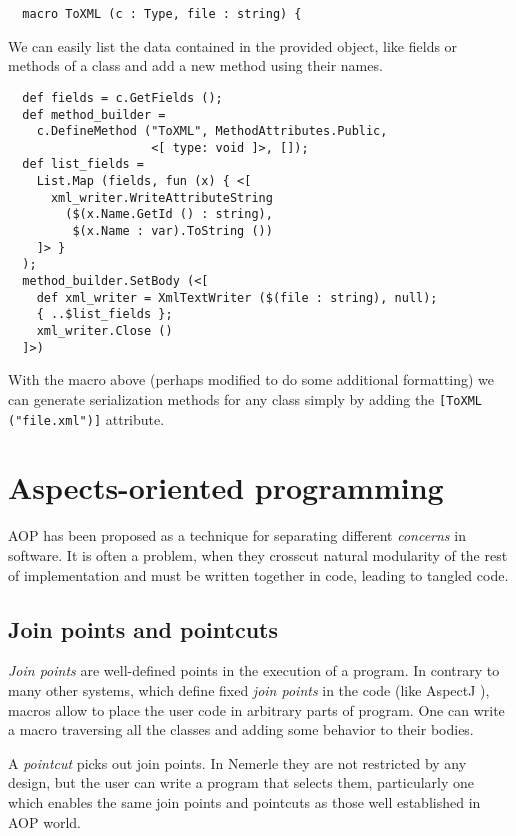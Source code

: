 \documentclass{llncs}
\begin{document}
\begin{verbatim}
  macro ToXML (c : Type, file : string) { 
\end{verbatim}

We can easily list the data contained in the provided object, like fields 
or methods of a class and add a new method using their names.

\begin{verbatim}
  def fields = c.GetFields ();
  def method_builder = 
    c.DefineMethod ("ToXML", MethodAttributes.Public, 
                    <[ type: void ]>, []);
  def list_fields = 
    List.Map (fields, fun (x) { <[ 
      xml_writer.WriteAttributeString 
        ($(x.Name.GetId () : string), 
         $(x.Name : var).ToString ())
    ]> }
  );
  method_builder.SetBody (<[
    def xml_writer = XmlTextWriter ($(file : string), null);
    { ..$list_fields };
    xml_writer.Close ()
  ]>)
\end{verbatim}

With the macro above (perhaps modified to do some additional formatting)
we can generate serialization methods for any class simply by adding 
the \verb,[ToXML ("file.xml")], attribute.

\section{Aspects-oriented programming}
AOP has been proposed as a technique for separating different 
\emph{concerns} in software. It is often a problem, when they crosscut 
natural modularity of the rest of implementation and must be written 
together in code, leading to tangled code. 

\subsection{Join points and pointcuts}
\emph{Join points} are well-defined points in the execution of a program.
In contrary to many other systems, which define fixed \emph{join points}
in the code (like AspectJ \cite{AspectJ}), macros allow to place the user code in 
arbitrary parts of program. One can write a macro traversing all the classes
and adding some behavior to their bodies. 

A \emph{pointcut} picks out join points. In Nemerle they are not
restricted by any design, but the user can write a program that selects them, 
particularly one which enables the same join points and pointcuts 
as those well established in AOP world.
 
\end{document}
